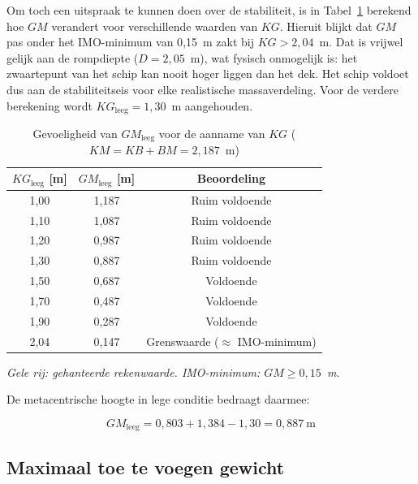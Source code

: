Om toch een uitspraak te kunnen doen over de stabiliteit, is in
Tabel~\ref{tab:KG_gevoeligheid} berekend hoe $GM$ verandert voor
verschillende waarden van $KG$. Hieruit blijkt dat $GM$ pas onder het
IMO-minimum van 0{,}15~m zakt bij $KG > 2{,}04$~m. Dat is vrijwel gelijk
aan de rompdiepte ($D = 2{,}05$~m), wat fysisch onmogelijk is: het
zwaartepunt van het schip kan nooit hoger liggen dan het dek. Het schip
voldoet dus aan de stabiliteitseis voor elke realistische massaverdeling.
Voor de verdere berekening wordt $KG_\mathrm{leeg} = 1{,}30$~m aangehouden.

\begin{table}[H]
\centering
\caption{Gevoeligheid van $GM_\mathrm{leeg}$ voor de aanname van $KG$
         ($KM = KB + BM = 2{,}187$~m)}
\label{tab:KG_gevoeligheid}
\small
\begin{tabular}{ccc}
\toprule
$KG_\mathrm{leeg}$ [m] & $GM_\mathrm{leeg}$ [m] & Beoordeling \\
\midrule
1{,}00 & 1{,}187 & Ruim voldoende \\
1{,}10 & 1{,}087 & Ruim voldoende \\
1{,}20 & 0{,}987 & Ruim voldoende \\
\rowcolor{yellow!20}
1{,}30 & 0{,}887 & Ruim voldoende \\
1{,}50 & 0{,}687 & Voldoende \\
1{,}70 & 0{,}487 & Voldoende \\
1{,}90 & 0{,}287 & Voldoende \\
2{,}04 & 0{,}147 & Grenswaarde ($\approx$ IMO-minimum) \\
\bottomrule
\end{tabular}
\vspace{4pt}

\noindent\footnotesize
\textit{Gele rij: gehanteerde rekenwaarde. IMO-minimum: $GM \geq 0{,}15$~m.}
\end{table}

De metacentrische hoogte in lege conditie bedraagt daarmee:

\begin{equation}
    GM_\mathrm{leeg} = 0{,}803 + 1{,}384 - 1{,}30 = \boxed{0{,}887\ \mathrm{m}}
    \label{eq:GM_leeg}
\end{equation}


\subsection{Maximaal toe te voegen gewicht}
\label{subsec:max_belading}

